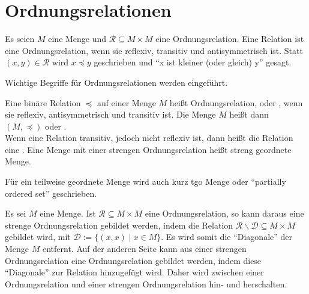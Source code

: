 \section{Ordnungsrelationen}
\label{sec:Relationen:Ordnungsrelationen}

\begin{Unit}
Es seien $M$ eine Menge und $\mathcal{R} \subseteq M \times M$ eine 
Ordnungsrelation. Eine Relation ist eine Ordnungsrelation, wenn sie reflexiv, 
transitiv und antisymmetrisch ist. Statt $(x,y) \in \mathcal{R}$ wird 
$x \preceq y$ geschrieben und \enquote{x ist kleiner (oder gleich) y} gesagt.

Wichtige Begriffe für Ordnungsrelationen werden eingeführt.

\begin{Definition}
  Eine binäre Relation $\preceq$ auf einer Menge $M$ heißt \Begriff
  {Ordnungsrelation},  
  oder , wenn sie 
  reflexiv, antisymmetrisch und transitiv ist. Die Menge $M$ heißt dann 
   $(M,\preceq)$ oder 
  .\\
  Wenn eine Relation transitiv, jedoch nicht reflexiv ist, dann heißt die 
  Relation eine . Eine Menge mit einer strengen Ordnungsrelation heißt \Begriff
  {streng geordnete Menge}.
\end{Definition}

Für ein teilweise geordnete Menge wird auch kurz \Begriff
{tgo Menge} oder  \enquote{partially 
ordered set} geschrieben.
\end{Unit}

\begin{Unit}[Anmerkung]
Es sei $M$ eine Menge. Ist $\mathcal{R} \subseteq M \times M$ eine 
Ordnungsrelation, so kann daraus eine strenge Ordnungsrelation gebildet 
werden, indem die Relation $\mathcal{R} \backslash \mathcal{D} \subseteq 
M \times M$ gebildet wird, mit $\mathcal{D} := \{(x,x) \mid x \in M\}$. Es 
wird somit die \enquote{Diagonale} der Menge $M$ entfernt. Auf der anderen 
Seite kann aus einer strengen Ordnungsrelation eine Ordnungsrelation gebildet
werden, indem diese \enquote{Diagonale} zur Relation hinzugefügt wird. Daher 
wird zwischen einer Ordnungsrelation und einer strengen Ordnungsrelation 
hin- und herschalten.
\end{Unit}

